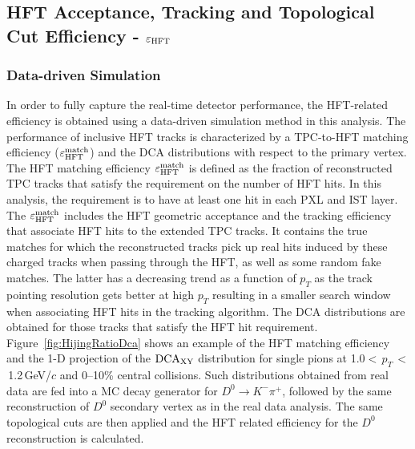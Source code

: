 \documentclass[%
 reprint,	
 amsmath,amssymb,
 aps,
 prc,
]{revtex4-1}
\begin{document}
\subsection{HFT Acceptance, Tracking and Topological Cut Efficiency - $\varepsilon_{\rm HFT}$}
\label{correction:hft}

\subsubsection{Data-driven Simulation} 
\label{correction:hft:fastsim}

In order to fully capture the real-time detector performance, the HFT-related efficiency is obtained using a data-driven simulation method in this analysis. The performance of inclusive HFT tracks is characterized by a TPC-to-HFT matching efficiency ($\varepsilon_{\rm HFT}^{\rm match}$) and the DCA distributions with respect to the primary vertex. The HFT matching efficiency $\varepsilon_{\rm HFT}^{\rm match}$ is defined as the fraction of reconstructed TPC tracks that satisfy the requirement on the number of HFT hits. In this analysis, the requirement is to have at least one hit in each PXL and IST layer. The $\varepsilon_{\rm HFT}^{\rm match}$ includes the HFT geometric acceptance and the tracking efficiency that associate HFT hits to the extended TPC tracks. It contains the true matches for which the reconstructed tracks pick up real hits induced by these charged tracks when passing through the HFT, as well as some random fake matches. The latter has a decreasing trend as a function of $p_T$ as the track pointing resolution gets better at high $p_T$ resulting in a smaller search window when associating HFT hits in the tracking algorithm. The DCA distributions are obtained for those tracks that satisfy the HFT hit requirement. Figure~\ref{fig:HijingRatioDca} shows an example of the HFT matching efficiency and the 1-D projection of the $\textup{DCA}_{\textup{XY}}$ distribution for single pions at 1.0$<$\,$p_{T}$\,$<$\,1.2\,GeV/$c$ and 0--10\% central collisions. Such distributions obtained from real data are fed into a MC decay generator for $D^0\rightarrow K^-\pi^+$, followed by the same reconstruction of $D^0$ secondary vertex as in the real data analysis. The same topological cuts are then applied and the HFT related efficiency for the $D^0$ reconstruction is calculated.
\end{document}
